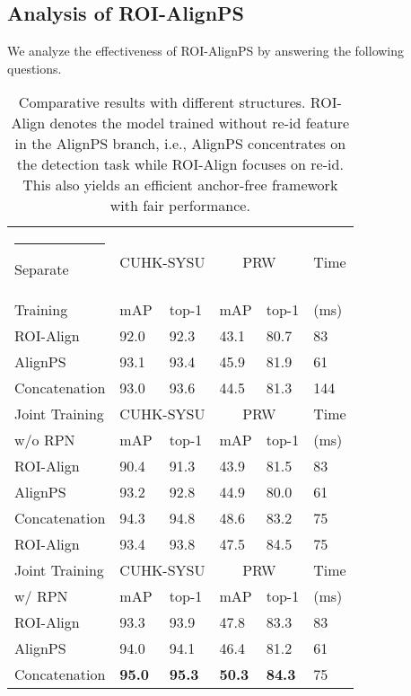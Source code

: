 \documentclass[journal]{IEEEtran}
\makeatletter
\newcommand{\thickhline}{\noalign {\ifnum 0=`}\fi \hrule height 1pt
    \futurelet \reserved@a \@xhline
}
\makeatother
\begin{document}
\subsection{Analysis of ROI-AlignPS}\label{sec:ana-r}
We analyze the effectiveness of ROI-AlignPS by answering the following questions.

\begin{table}[t]
\small
\centering
\begin{tabular}{p{2.2cm}|p{0.8cm}<{\centering}p{0.8cm}<{\centering}|p{0.8cm}<{\centering}p{0.8cm}<{\centering}|p{0.7cm}<{\centering}}
\hline\thickhline
\rowcolor{mygray} \rowcolor{mygray} 
 {Separate} & \multicolumn{2}{c|}{CUHK-SYSU} & \multicolumn{2}{c|}{PRW}  & \multicolumn{1}{c}{Time}   \\ \cline{2-5} 
\rowcolor{mygray} 
{Training}  & mAP & top-1  & mAP  & top-1 & (ms) \\  \hline \hline   
ROI-Align
   & 92.0   & 92.3       & 43.1   & 80.7 & 83\\
AlignPS  & 93.1   & 93.4       & 45.9   & 81.9  & 61\\ 
Concatenation & 93.0 & 93.6 & 44.5    & 81.3 & 144\\\hline
\rowcolor{mygray} \rowcolor{mygray} 
 {Joint Training}  & \multicolumn{2}{c|}{CUHK-SYSU} & \multicolumn{2}{c|}{PRW}  &{Time}  \\ \cline{2-5} 
\rowcolor{mygray} 
{w/o RPN}  & mAP & top-1  & mAP  & top-1 & (ms) \\  \hline \hline    
ROI-Align
   & 90.4   &   91.3     & 43.9   & 81.5 & 83\\
AlignPS  & 93.2   & 92.8       &44.9   & 80.0  & 61\\ 
Concatenation  &94.3 & 94.8 & 48.6    & 83.2 & 75\\ \hdashline
ROI-Align
   & 93.4   & 93.8       & 47.5   & 84.5 & 75\\
\hline
\rowcolor{mygray} \rowcolor{mygray} 
{Joint Training}  & \multicolumn{2}{c|}{CUHK-SYSU} & \multicolumn{2}{c|}{PRW}  &{Time}  \\ \cline{2-5} 
\rowcolor{mygray} 
{w/ RPN}  & mAP & top-1  & mAP  & top-1 & (ms) \\  \hline \hline     
ROI-Align
   & 93.3   &   93.9     & 47.8   & 83.3 & 83\\
AlignPS  & 94.0   & 94.1       &46.4   & 81.2  & 61\\ 
Concatenation  &\textbf{95.0} & \textbf{95.3} & \textbf{50.3}    & \textbf{84.3} & 75\\\hline
\end{tabular}
\caption{Comparative results with different structures. ROI-Align denotes the model trained without re-id feature in the AlignPS branch, i.e., AlignPS concentrates on the detection task while ROI-Align focuses on re-id. This also yields an efficient anchor-free framework with fair performance. }
\label{tab:rbn}
\end{table}
\end{document}
